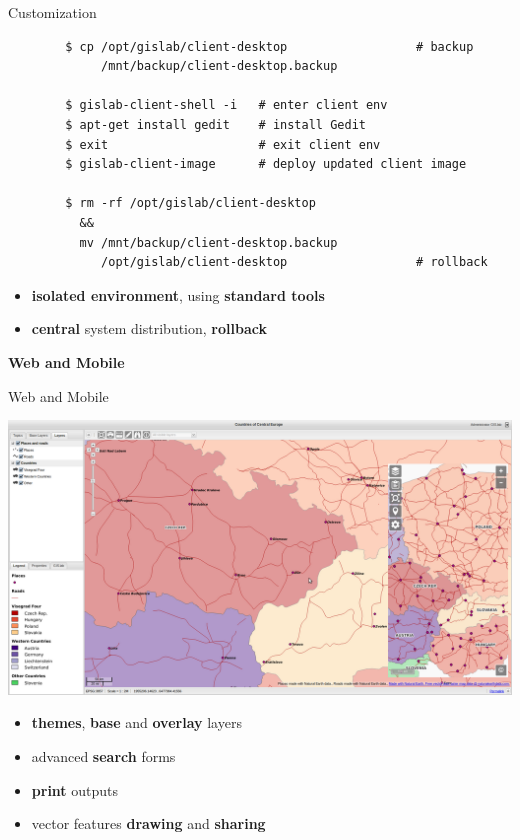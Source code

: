 \documentclass[12pt]{beamer}
\begin{document}
\begin{frame}[fragile]{Customization}
	\lstset{language=sh}
	\begin{lstlisting}
		$ cp /opt/gislab/client-desktop                  # backup
		     /mnt/backup/client-desktop.backup
		
		$ gislab-client-shell -i   # enter client env
		$ apt-get install gedit    # install Gedit
		$ exit                     # exit client env
		$ gislab-client-image      # deploy updated client image
		
		$ rm -rf /opt/gislab/client-desktop
		  &&
		  mv /mnt/backup/client-desktop.backup
		     /opt/gislab/client-desktop                  # rollback
	\end{lstlisting}

	\begin{itemize}
		\item \textbf{isolated environment}, using \textbf{standard tools}
		\item \textbf{central} system distribution, \textbf{rollback}
	\end{itemize}
\end{frame}


\begin{frame}
	\begin{center}
		\LARGE\textbf{Web and Mobile}
	\end{center}
\end{frame}

\begin{frame}{Web and Mobile}
	\begin{center}
		\includegraphics[keepaspectratio=true,height=0.5\textheight]{images/gislab-web+mobile.png}
	\end{center}
	\begin{itemize}
		\item \textbf{themes}, \textbf{base} and \textbf{overlay} layers
		\item advanced \textbf{search} forms
		\item \textbf{print} outputs
		\item vector features \textbf{drawing} and \textbf{sharing}
	\end{itemize}
\end{frame}
\end{document}
